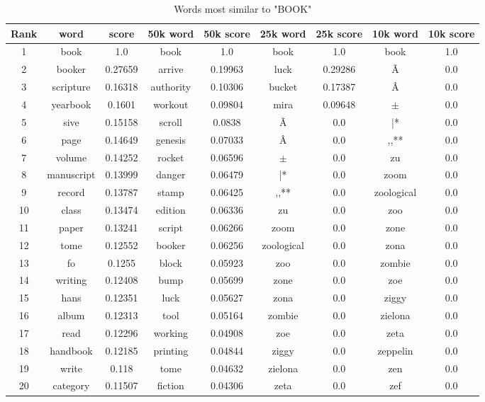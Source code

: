 \documentclass[10pt, a4paper, oneside]{article} %
\begin{document}
\begin{table}[!h]
\centering
\begin{tabular}{ | c | c | c | | c | c || c | c || c | c |}
\hline
Rank & word & score  & 50k word & 50k score & 25k word & 25k score & 10k word & 10k score\\ \hline
1 & book & 1.0 &book & 1.0 &book & 1.0 &book & 1.0 \\
2 & booker & 0.27659 &arrive & 0.19963 &luck & 0.29286 &Ã & 0.0 \\
3 & scripture & 0.16318 &authority & 0.10306 &bucket & 0.17387 &Â & 0.0 \\
4 & yearbook & 0.1601 &workout & 0.09804 &mira & 0.09648 &$\pm$ & 0.0 \\
5 & sive & 0.15158 &scroll & 0.0838 &Ã & 0.0 &|* & 0.0 \\
6 & page & 0.14649 &genesis & 0.07033 &Â & 0.0 &,,** & 0.0 \\
7 & volume & 0.14252 &rocket & 0.06596 &$\pm$ & 0.0 &zu & 0.0 \\
8 & manuscript & 0.13999 &danger & 0.06479 &|* & 0.0 &zoom & 0.0 \\
9 & record & 0.13787 &stamp & 0.06425 &,,** & 0.0 &zoological & 0.0 \\
10 & class & 0.13474 &edition & 0.06336 &zu & 0.0 &zoo & 0.0 \\
11 & paper & 0.13241 &script & 0.06266 &zoom & 0.0 &zone & 0.0 \\
12 & tome & 0.12552 &booker & 0.06256 &zoological & 0.0 &zona & 0.0 \\
13 & fo & 0.1255 &block & 0.05923 &zoo & 0.0 &zombie & 0.0 \\
14 & writing & 0.12408 &bump & 0.05699 &zone & 0.0 &zoe & 0.0 \\
15 & hans & 0.12351 &luck & 0.05627 &zona & 0.0 &ziggy & 0.0 \\
16 & album & 0.12313 &tool & 0.05164 &zombie & 0.0 &zielona & 0.0 \\
17 & read & 0.12296 &working & 0.04908 &zoe & 0.0 &zeta & 0.0 \\
18 & handbook & 0.12185 &printing & 0.04844 &ziggy & 0.0 &zeppelin & 0.0 \\
19 & write & 0.118 &tome & 0.04632 &zielona & 0.0 &zen & 0.0 \\
20 & category & 0.11507 &fiction & 0.04306 &zeta & 0.0 &zef & 0.0 \\
 \hline
\end{tabular}
\caption{Words most similar to "BOOK"}
\label{book}
\end{table}
\end{document}

